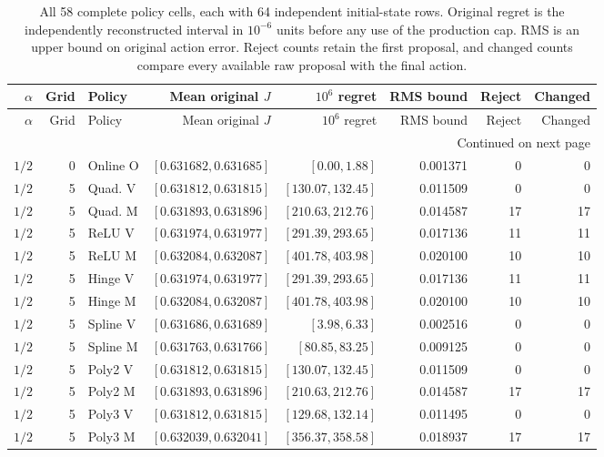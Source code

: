 \begingroup
\small\setlength{\tabcolsep}{3pt}
\begin{longtable}{rrlrrrrr}
\caption{All 58 complete policy cells, each with 64 independent initial-state rows. Original regret is the independently reconstructed interval in $10^{-6}$ units before any use of the production cap. RMS is an upper bound on original action error. Reject counts retain the first proposal, and changed counts compare every available raw proposal with the final action.}\label{tab:allpolicies121}\\
\toprule
$\alpha$ & Grid & Policy & Mean original $J$ & $10^6$ regret & RMS bound & Reject & Changed\\
\midrule\endfirsthead
\toprule
$\alpha$ & Grid & Policy & Mean original $J$ & $10^6$ regret & RMS bound & Reject & Changed\\
\midrule\endhead
\midrule\multicolumn{8}{r}{Continued on next page}\\\endfoot
\bottomrule\endlastfoot
$1/2$ & 0 & Online O & $[0.631682,0.631685]$ & $[0.00,1.88]$ & 0.001371 & 0 & 0\\
$1/2$ & 5 & Quad. V & $[0.631812,0.631815]$ & $[130.07,132.45]$ & 0.011509 & 0 & 0\\
$1/2$ & 5 & Quad. M & $[0.631893,0.631896]$ & $[210.63,212.76]$ & 0.014587 & 17 & 17\\
$1/2$ & 5 & ReLU V & $[0.631974,0.631977]$ & $[291.39,293.65]$ & 0.017136 & 11 & 11\\
$1/2$ & 5 & ReLU M & $[0.632084,0.632087]$ & $[401.78,403.98]$ & 0.020100 & 10 & 10\\
$1/2$ & 5 & Hinge V & $[0.631974,0.631977]$ & $[291.39,293.65]$ & 0.017136 & 11 & 11\\
$1/2$ & 5 & Hinge M & $[0.632084,0.632087]$ & $[401.78,403.98]$ & 0.020100 & 10 & 10\\
$1/2$ & 5 & Spline V & $[0.631686,0.631689]$ & $[3.98,6.33]$ & 0.002516 & 0 & 0\\
$1/2$ & 5 & Spline M & $[0.631763,0.631766]$ & $[80.85,83.25]$ & 0.009125 & 0 & 0\\
$1/2$ & 5 & Poly2 V & $[0.631812,0.631815]$ & $[130.07,132.45]$ & 0.011509 & 0 & 0\\
$1/2$ & 5 & Poly2 M & $[0.631893,0.631896]$ & $[210.63,212.76]$ & 0.014587 & 17 & 17\\
$1/2$ & 5 & Poly3 V & $[0.631812,0.631815]$ & $[129.68,132.14]$ & 0.011495 & 0 & 0\\
$1/2$ & 5 & Poly3 M & $[0.632039,0.632041]$ & $[356.37,358.58]$ & 0.018937 & 17 & 17\\

\end{longtable}

